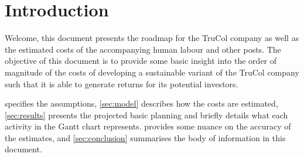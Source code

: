 \section{Introduction}\label{sec:intro}
Welcome, this document presents the roadmap for the TruCol company as well as the estimated costs of the accompanying human labour and other posts. The objective of this document is to provide some basic insight into the order of magnitude of the costs of developing a sustainable variant of the TruCol company such that it is able to generate returns for its potential investors.

 specifies the assumptions, \cref{sec:model} describes how the costs are estimated, \cref{sec:results} presents the projected basic planning and briefly details what each activity in the Gantt chart represents.  provides some nuance on the accuracy of the estimates, and \cref{sec:conclusion} summarises the body of information in this document.